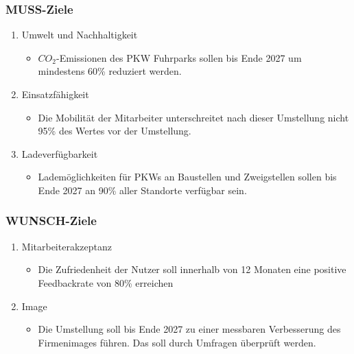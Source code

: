 \documentclass{article}
\begin{document}
	\subsubsection{MUSS-Ziele}
	\begin{enumerate}
		\item{Umwelt und Nachhaltigkeit}
		\begin{itemize}
			\item{$CO_2$-Emissionen des PKW Fuhrparks sollen bis Ende 2027 um mindestens 60\% reduziert werden.}
		\end{itemize}
		\item{Einsatzfähigkeit}
		\begin{itemize}
			\item{Die Mobilität der Mitarbeiter unterschreitet nach dieser Umstellung nicht 95\% des Wertes vor der Umstellung.}
		\end{itemize}
		\item{Ladeverfügbarkeit}
		\begin{itemize}
			\item{Lademöglichkeiten für PKWs an Baustellen und Zweigstellen sollen bis Ende 2027 an 90\% aller Standorte verfügbar sein.}
		\end{itemize}
	\end{enumerate}
	\subsubsection{WUNSCH-Ziele}
	\begin{enumerate}
		\item{Mitarbeiterakzeptanz}
		\begin{itemize}
			\item{Die Zufriedenheit der Nutzer soll innerhalb von 12 Monaten eine positive Feedbackrate von 80\% erreichen}
		\end{itemize}
		\item{Image}
		\begin{itemize}
			\item{Die Umstellung soll bis Ende 2027 zu einer messbaren Verbesserung des Firmenimages führen. Das soll durch Umfragen überprüft werden.}
		\end{itemize}
	\end{enumerate}
\end{document}
